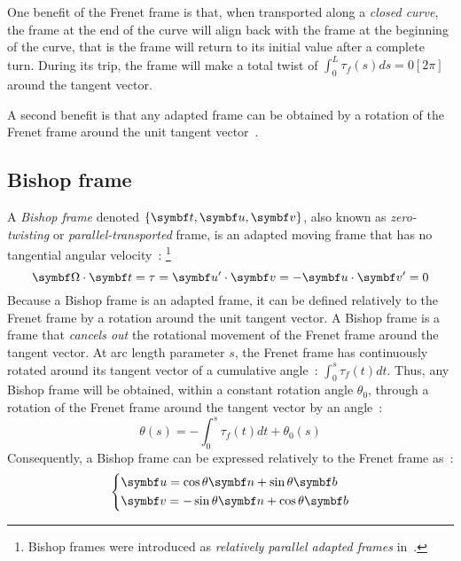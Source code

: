 One benefit of the Frenet frame is that, when transported along a \emph{closed curve}, the frame at the end of the curve will align back with the frame at the beginning of the curve, that is the frame will return to its initial value after a complete turn. During its trip, the frame will make a total twist of $\int_0^L \tau_f(s)ds = 0[2\pi]$ around the tangent vector.

A second benefit is that any adapted frame can be obtained by a rotation of the Frenet frame around the unit tangent vector~\cite[p.2]{Guggenheimer1989}.

\subsection{Bishop frame}\label{sec=bishop}

A \emph{Bishop frame} denoted $\{\vect{t},\vect{u},\vect{v}\}$, also known as \emph{zero-twisting} or \emph{parallel-transported} frame, is an adapted moving frame that has no tangential angular velocity~: \footnote{Bishop frames were introduced as \emph{relatively parallel adapted frames} in~\cite{Bishop1975}.}
\begin{equation}
	\vect{\Omega} \cdot \vect{t} = \tau =\vect{u}' \cdot \vect{v} = - \vect{u} \cdot \vect{v}' = 0
	\label{eq:null_velocity}
\end{equation}
Because a Bishop frame is an adapted frame, it can be defined relatively to the Frenet frame by a rotation around the unit tangent vector. A Bishop frame is a frame that \emph{cancels out} the rotational movement of the Frenet frame around the tangent vector. At arc length parameter $s$, the Frenet frame has continuously rotated around its tangent vector of a cumulative angle~: $\int_0^s \tau_f(t)dt$. Thus, any Bishop frame will be obtained, within a constant rotation angle $\theta_0$, through a rotation of the Frenet frame around the tangent vector by an angle~:
\begin{equation}
	\theta(s)  =  - \int_0^s \tau_f(t)dt + \theta_0(s)
\end{equation}
Consequently, a Bishop frame can be expressed relatively to the Frenet frame as~:
\begin{equation}
	\left\{
	\begin{aligned}
		&\vect{u} = \cos \theta \vect{n} +  \sin \theta \vect{b}\\
		&\vect{v} = -\sin \theta \vect{n} +  \cos \theta \vect{b}
	\end{aligned}
	\right.
\end{equation}
